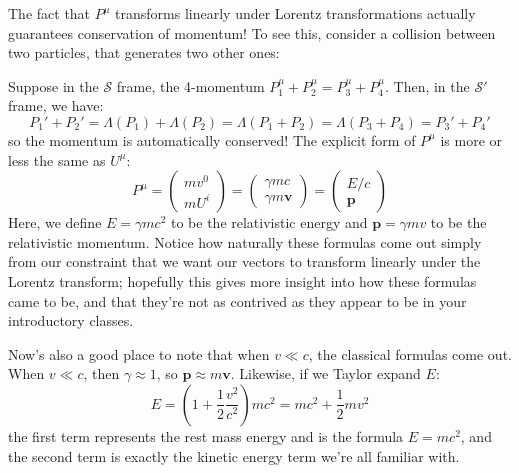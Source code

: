 The fact that \( P^{\mu} \) transforms linearly under Lorentz transformations actually guarantees
conservation of momentum! To see this, consider a collision between two particles, that generates two other
ones:
\begin{center}
\end{center}
Suppose in the \( \mathcal{S} \) frame, the 4-momentum \( P_1^{\mu} + P_2^{\mu} = P_3^{\mu} + P_4^{\mu} \).
Then, in the \( \mathcal{S}' \) frame, we have:
\[
	P_1' + P_2' = \Lambda(P_1) + \Lambda(P_2) = \Lambda(P_1 + P_2) = \Lambda(P_3 + P_4) = P_3' + P_4'
\]
so the momentum is automatically conserved! The explicit form of \( P^{\mu} \) is more or less the 
same as \( U^{\mu} \):
\[
	P^{\mu} = \begin{pmatrix} mv^{0} \\ m U^{i} \end{pmatrix} = \begin{pmatrix} \gamma mc \\ \gamma
	m \mathbf{v} \end{pmatrix} = \begin{pmatrix} E / c \\ \mathbf{p} \end{pmatrix}
\]
Here, we define \( E = \gamma mc^2 \) to be the relativistic energy and \( \mathbf{p} = \gamma mv \) to be
the relativistic momentum. Notice how naturally these formulas come out simply from our constraint that we
want our vectors to transform linearly under the Lorentz transform; hopefully this gives more insight into
how these formulas came to be, and that they're not as contrived as they appear to be in your introductory
classes. 

Now's also a good place to note that when \( v \ll c \), the classical formulas come out. When \(  v\ll c \),
then \( \gamma \approx 1 \), so \( \mathbf{p} \approx m \mathbf{v} \). Likewise, if we Taylor expand \( E \):
\[
	E = \left( 1 + \frac{1}{2} \frac{v^2}{c^2} \right) mc^2 = mc^2 + \frac{1}{2}mv^2
\]
the first term represents the rest mass energy and is the formula \( E = mc^2 \), and the second term 
is exactly the kinetic energy term we're all familiar with. 

